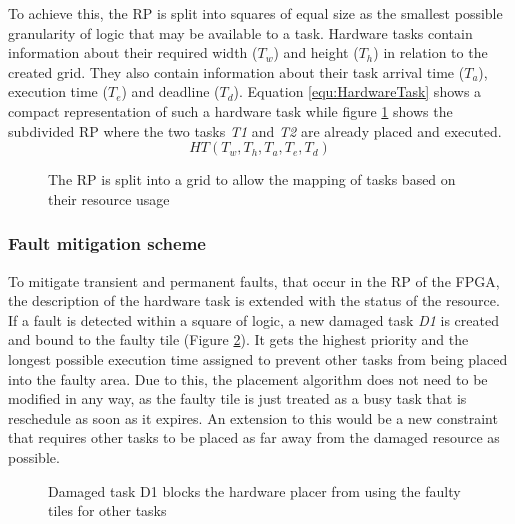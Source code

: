 To achieve this, the \gls{RP} is split into squares of equal size as the smallest possible granularity of logic that may be available to a task.
Hardware tasks contain information about their required width ($T_w$) and height ($T_h$) in relation to the created grid. 
They also contain information about their task arrival time ($T_a$), execution time ($T_e$) and deadline ($T_d$).
Equation \ref{equ:HardwareTask} shows a compact representation of such a hardware task while figure \ref{fig:TaskGrid} shows the subdivided \gls{RP} where the two tasks \textit{T1} and \textit{T2} are already placed and executed.
\begin{equation}\label{equ:HardwareTask}
    HT(T_w, T_h, T_a, T_e, T_d)
\end{equation}
\begin{figure}
    \centering
    \scalebox{0.5}{
    \resizebox{\smallColumnWidth}{!}{}
    }
    \caption{The \gls{RP} is split into a grid to allow the mapping of tasks based on their resource usage}\label{fig:TaskGrid}
\end{figure}
\subsubsection{Fault mitigation scheme}
To mitigate transient and permanent faults, that occur in the \gls{RP} of the \gls{FPGA}, the description of the hardware task is extended with the status of the resource.
If a fault is detected within a square of logic, a new damaged task \textit{D1} is created and bound to the faulty tile (Figure \ref{fig:TaskGridFault}).
It gets the highest priority and the longest possible execution time assigned to prevent other tasks from being placed into the faulty area.
Due to this, the placement algorithm does not need to be modified in any way, as the faulty tile is just treated as a busy task that is reschedule as soon as it expires.
An extension to this would be a new constraint that requires other tasks to be placed as far away from the damaged resource as possible. 
\begin{figure}
    \centering
    \scalebox{0.5}{
    \resizebox{\smallColumnWidth}{!}{}
    }
    \caption{Damaged task D1 blocks the hardware placer from using the faulty tiles for other tasks}\label{fig:TaskGridFault}
\end{figure}
 
